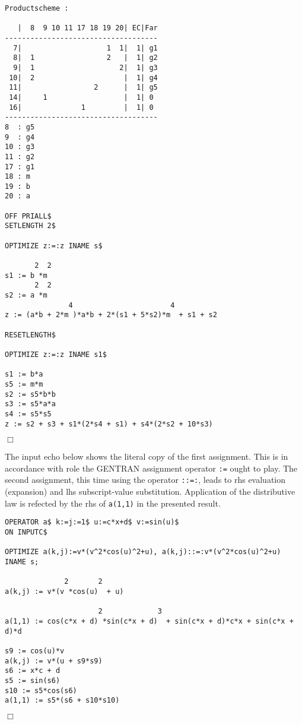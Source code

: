 {\small
\begin{verbatim}
Productscheme :

   |  8  9 10 11 17 18 19 20| EC|Far
------------------------------------
  7|                    1  1|  1| g1
  8|  1                 2   |  1| g2
  9|  1                    2|  1| g3
 10|  2                     |  1| g4
 11|                 2      |  1| g5
 14|     1                  |  1| 0
 16|              1         |  1| 0
------------------------------------
8  : g5
9  : g4
10 : g3
11 : g2
17 : g1
18 : m
19 : b
20 : a

OFF PRIALL$
SETLENGTH 2$

OPTIMIZE z:=:z INAME s$

       2  2
s1 := b *m
       2  2
s2 := a *m
               4                       4
z := (a*b + 2*m )*a*b + 2*(s1 + 5*s2)*m  + s1 + s2

RESETLENGTH$

OPTIMIZE z:=:z INAME s1$

s1 := b*a
s5 := m*m
s2 := s5*b*b
s3 := s5*a*a
s4 := s5*s5
z := s2 + s3 + s1*(2*s4 + s1) + s4*(2*s2 + 10*s3)
\end{verbatim}
\begin{flushright}
$\Box$
\end{flushright}}
\example\label{ex:3.1.3}

The input echo below shows the literal copy of the first assignment.
This is in accordance with role the GENTRAN assignment operator {\tt :=}
ought to play.  The second assignment, this time using the operator {\tt ::=:},
leads to rhs evaluation (expansion) and lhs subscript-value substitution.
Application of the distributive law is refected by the rhs of {\tt a(1,1)}
in the presented result.
{\small
\begin{verbatim}
OPERATOR a$ k:=j:=1$ u:=c*x+d$ v:=sin(u)$
ON INPUTC$

OPTIMIZE a(k,j):=v*(v^2*cos(u)^2+u), a(k,j)::=:v*(v^2*cos(u)^2+u) INAME s;

              2       2
a(k,j) := v*(v *cos(u)  + u)

                      2             3
a(1,1) := cos(c*x + d) *sin(c*x + d)  + sin(c*x + d)*c*x + sin(c*x + d)*d

s9 := cos(u)*v
a(k,j) := v*(u + s9*s9)
s6 := x*c + d
s5 := sin(s6)
s10 := s5*cos(s6)
a(1,1) := s5*(s6 + s10*s10)
\end{verbatim}
\begin{flushright}
$\Box$
\end{flushright}}
\example\label{ex:3.1.4}


